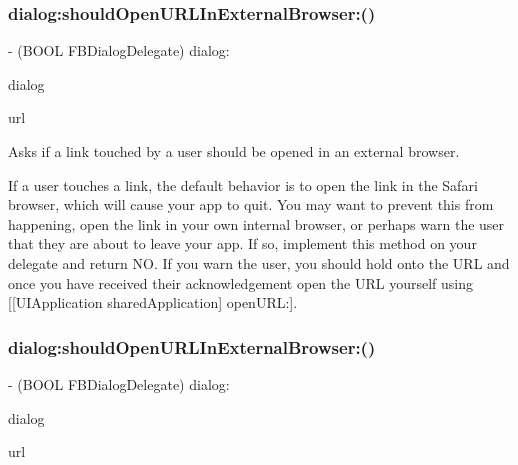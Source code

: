 \subsubsection{\texorpdfstring{dialog\+:should\+Open\+U\+R\+L\+In\+External\+Browser\+:()}{dialog:shouldOpenURLInExternalBrowser:()}\hspace{0.1cm}{\footnotesize\ttfamily [1/2]}}
{\footnotesize\ttfamily -\/ (B\+O\+OL F\+B\+Dialog\+Delegate) dialog\+: \begin{DoxyParamCaption}\item[{(\hyperlink{interfaceFBDialog}{F\+B\+Dialog} $\ast$)}]{dialog }\item[{shouldOpenURLInExternalBrowser:(N\+S\+U\+RL $\ast$)}]{url }\end{DoxyParamCaption}\hspace{0.3cm}{\ttfamily [optional]}}

Asks if a link touched by a user should be opened in an external browser.

If a user touches a link, the default behavior is to open the link in the Safari browser, which will cause your app to quit. You may want to prevent this from happening, open the link in your own internal browser, or perhaps warn the user that they are about to leave your app. If so, implement this method on your delegate and return NO. If you warn the user, you should hold onto the U\+RL and once you have received their acknowledgement open the U\+RL yourself using \mbox{[}\mbox{[}U\+I\+Application shared\+Application\mbox{]} open\+U\+RL\+:\mbox{]}. \mbox{\label{protocolFBDialogDelegate_01-p_aa560b9b9075a46eeeb61c6e951e7a17b}} 
\subsubsection{\texorpdfstring{dialog\+:should\+Open\+U\+R\+L\+In\+External\+Browser\+:()}{dialog:shouldOpenURLInExternalBrowser:()}\hspace{0.1cm}{\footnotesize\ttfamily [2/2]}}
{\footnotesize\ttfamily -\/ (B\+O\+OL F\+B\+Dialog\+Delegate) dialog\+: \begin{DoxyParamCaption}\item[{(\hyperlink{interfaceFBDialog}{F\+B\+Dialog} $\ast$)}]{dialog }\item[{shouldOpenURLInExternalBrowser:(N\+S\+U\+RL $\ast$)}]{url }\end{DoxyParamCaption}\hspace{0.3cm}{\ttfamily [optional]}}

